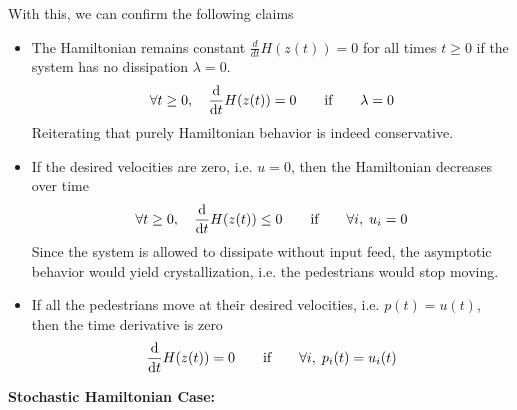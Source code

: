 With this, we can confirm the following claims
\begin{itemize}
    \item The Hamiltonian remains constant $\frac{d}{dt}H(z(t)) = 0$ for all times $t \geq 0$ if the system has no dissipation $\lambda = 0$. 
    \begin{align*}
        \forall t \geq 0,\quad \dfrac{\mathrm d }{\mathrm d t}H(z(t)) = 0 \qquad \text{if} \qquad \lambda = 0
    \end{align*}
    Reiterating that purely Hamiltonian behavior is indeed conservative.
    \item If the desired velocities are zero, i.e. $u = 0$, then the Hamiltonian decreases over time
    \begin{align*}
        \forall t \geq 0,\quad \dfrac{\mathrm d }{\mathrm d t}H(z(t)) \leq 0 \qquad \text{if} \qquad \forall i,\; u_i = 0
    \end{align*}
    Since the system is allowed to dissipate without input feed, the asymptotic behavior would yield crystallization, i.e. the pedestrians would stop moving.
    \item If all the pedestrians move at their desired velocities, i.e. $p(t) = u(t)$, then the time derivative is zero
    \begin{align*}
        \dfrac{\mathrm d }{\mathrm d t} H(z(t)) = 0 \qquad \text{if} \qquad \forall i,\; p_i(t) = u_i(t)
    \end{align*}
\end{itemize}

\textbf{Stochastic Hamiltonian Case:}

